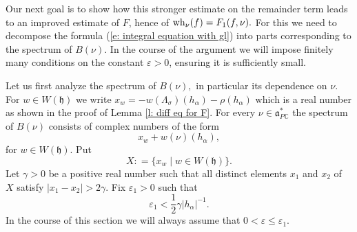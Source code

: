 \documentclass[12pt,a4paper]{article}
\def\msy#1{{\mathbb #1}}
\def\C{{\msy C}}
\def\ga{\alpha}
\def\ge{\varepsilon}
\def\gg{\gamma}
\def\gs{\sigma}
\def\got#1{\mathfrak #1}
\def\fa{{\got a}}
\def\fh{{\got h}}
\def\iC{{\scriptscriptstyle \C}}
\numberwithin{Thm}{section}
\numberwithin{equation}{section}
\def\faPdc{{\fa_{P\iC}^*}}
\def\gL{\Lambda}
\numberwithin{equation}{section}
\def\gL{\Lambda}
\def\faPdc{\fa_{P\iC}^*}
\def\fh{{\mathfrak h}}
\def\wh{{\rm wh}}
\def\xx{x}
\begin{document}
%
Our next goal is to show how this stronger estimate on the remainder term leads to an improved estimate
of $F$, hence of $\wh_\nu(f)= F_1(f,\nu).$ For this we need to decompose the formula (\ref{e: integral equation with gl}) into parts corresponding to the spectrum of $B(\nu).$ 
In the course of the argument we will impose finitely many conditions on the constant $\ge >0$, ensuring it is sufficiently small. 

Let us first analyze the spectrum of $B(\nu),$ in particular its dependence on $\nu.$ 
For $w \in W(\fh)$ we  
write $\xx_w = - w(\gL_\gs)(h_\ga) - \rho(h_\ga)$ which is a real number as shown in the proof
of Lemma \ref{l: diff eq for F}. For every $\nu \in \faPdc$ the spectrum of $B(\nu)$ 
consists of complex numbers of the form 
$$ 
\xx_w + w(\nu)(h_\ga),
$$ 
for $w \in W(\fh).$ 
Put 
$$ 
X: = \{ \xx_w \mid w \in W(\fh)\}.
$$ 
Let $\gg >0 $ be a positive real number such that all distinct elements $\xx_1$ and $\xx_2$ 
of $X$  satisfy $|\xx_1 - \xx_2| > 2 \gg.$  Fix $\ge_1 > 0$ such that 
$$
\ge_1 < \frac12 \gg |h_\ga|^{-1}.
$$
In the course of this section we will always assume that 
$0< \ge \leq \ge_1.$
\end{document}
